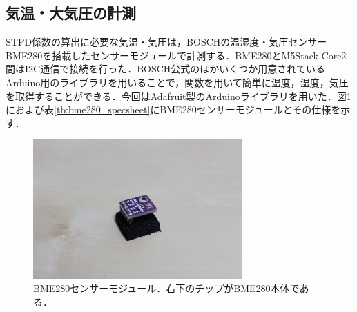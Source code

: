 

\subsection{気温・大気圧の計測}
\label{sec:measuring_ambient}

STPD係数の算出に必要な気温・気圧は，BOSCHの温湿度・気圧センサーBME280を搭載したセンサーモジュールで計測する．BME280とM5Stack Core2間はI2C通信で接続を行った．BOSCH公式のほかいくつか用意されているArduino用のライブラリを用いることで，関数を用いて簡単に温度，湿度，気圧を取得することができる．今回はAdafruit製のArduinoライブラリを用いた．図\ref{fig:bme280}におよび表\ref{tb:bme280_specsheet}にBME280センサーモジュールとその仕様を示す．

\begin{figure}[H]
  \begin{center}
    \includegraphics[width=8cm]{fig/bme280}
    \caption{BME280センサーモジュール．右下のチップがBME280本体である．}
    \label{fig:bme280}
  \end{center}
\end{figure}

